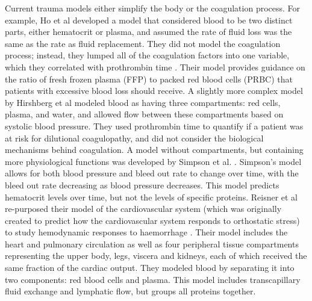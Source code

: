 \documentclass[11pt]{article}
\begin{document}
Current trauma models either simplify the body or the coagulation process.
For example, Ho et al developed a model that considered blood to be two distinct parts, either hematocrit or plasma, and assumed the rate of fluid loss was the same as the rate as fluid replacement. They did not model the coagulation process; instead, they lumped all of the coagulation factors into one variable, which they correlated with prothrombin time \cite{ho2005mathematical}.
Their model provides guidance on the ratio of fresh frozen plasma (FFP) to packed red blood cells (PRBC) that patients with excessive blood loss should receive.
A slightly more complex model by Hirshberg et al modeled blood as having three compartments: red cells, plasma, and water, and allowed flow between these compartments based on systolic blood pressure. \cite{hirshberg2003minimizing} They used prothrombin time to quantify if a patient was at risk for dilutional coagulopathy, and did not consider the biological mechanisms behind coagulation. A model without compartments, but containing more physiological functions was developed by Simpson et al. \cite{simpson1996computer}.
Simpson's model allows for both blood pressure and bleed out rate to change over time, with the bleed out rate decreasing as blood pressure decreases. This model predicts hematocrit levels over time, but not the levels of specific proteins. Reisner et al re-purposed their model of the cardiovascular system (which was originally created to predict how the cardiovascular system responds to orthostatic stress) to study hemodynamic responses to haemorrhage \cite{reisner2013computational}.
Their model includes the heart and pulmonary circulation as well as four peripheral tissue compartments representing the upper body, legs, viscera and kidneys, each of which received the same fraction of the cardiac output. They modeled blood by separating it into two components: red blood cells and plasma.
This model includes transcapillary fluid exchange and lymphatic flow, but groups all proteins together.
\end{document}
